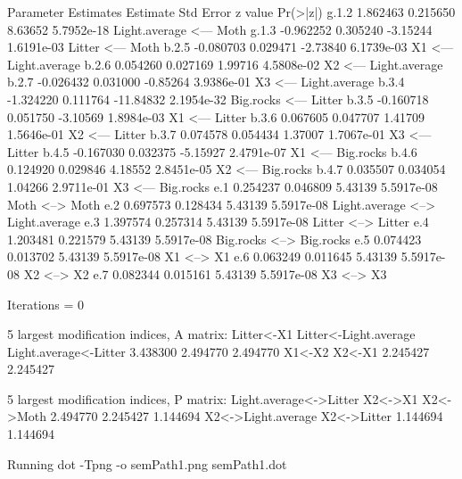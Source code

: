 \documentclass[12pt]{article}
\begin{document}
\begin{Schunk}
\begin{Soutput}
 Parameter Estimates
      Estimate  Std Error z value   Pr(>|z|)                                   
g.1.2  1.862463 0.215650    8.63652 5.7952e-18 Light.average <--- Moth         
g.1.3 -0.962252 0.305240   -3.15244 1.6191e-03 Litter <--- Moth                
b.2.5 -0.080703 0.029471   -2.73840 6.1739e-03 X1 <--- Light.average           
b.2.6  0.054260 0.027169    1.99716 4.5808e-02 X2 <--- Light.average           
b.2.7 -0.026432 0.031000   -0.85264 3.9386e-01 X3 <--- Light.average           
b.3.4 -1.324220 0.111764  -11.84832 2.1954e-32 Big.rocks <--- Litter           
b.3.5 -0.160718 0.051750   -3.10569 1.8984e-03 X1 <--- Litter                  
b.3.6  0.067605 0.047707    1.41709 1.5646e-01 X2 <--- Litter                  
b.3.7  0.074578 0.054434    1.37007 1.7067e-01 X3 <--- Litter                  
b.4.5 -0.167030 0.032375   -5.15927 2.4791e-07 X1 <--- Big.rocks               
b.4.6  0.124920 0.029846    4.18552 2.8451e-05 X2 <--- Big.rocks               
b.4.7  0.035507 0.034054    1.04266 2.9711e-01 X3 <--- Big.rocks               
e.1    0.254237 0.046809    5.43139 5.5917e-08 Moth <--> Moth                  
e.2    0.697573 0.128434    5.43139 5.5917e-08 Light.average <--> Light.average
e.3    1.397574 0.257314    5.43139 5.5917e-08 Litter <--> Litter              
e.4    1.203481 0.221579    5.43139 5.5917e-08 Big.rocks <--> Big.rocks        
e.5    0.074423 0.013702    5.43139 5.5917e-08 X1 <--> X1                      
e.6    0.063249 0.011645    5.43139 5.5917e-08 X2 <--> X2                      
e.7    0.082344 0.015161    5.43139 5.5917e-08 X3 <--> X3                      

 Iterations =  0 
\end{Soutput}
\begin{Soutput}
 5 largest modification indices, A matrix:
           Litter<-X1 Litter<-Light.average Light.average<-Litter 
             3.438300              2.494770              2.494770 
               X1<-X2                X2<-X1 
             2.245427              2.245427 

  5 largest modification indices, P matrix:
Light.average<->Litter                X2<->X1              X2<->Moth 
              2.494770               2.245427               1.144694 
    X2<->Light.average            X2<->Litter 
              1.144694               1.144694 
\end{Soutput}
\begin{Soutput}
Running  dot -Tpng -o semPath1.png  semPath1.dot 
\end{Soutput}
\end{Schunk}
\end{document}

